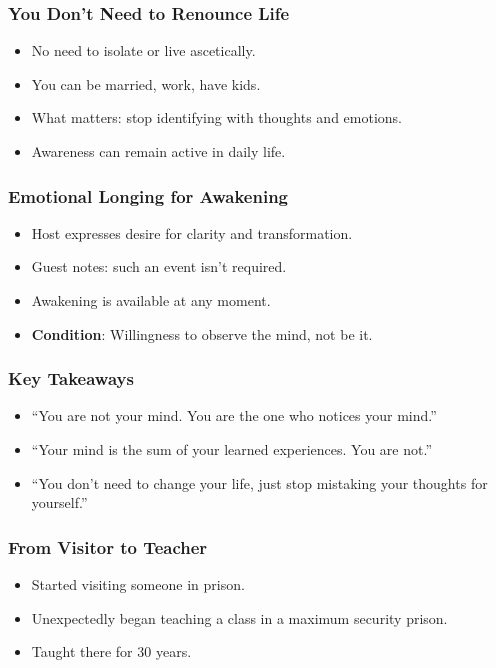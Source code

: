 \begin{frame}[fragile]\frametitle{You Don’t Need to Renounce Life}
  \begin{itemize}
    \item No need to isolate or live ascetically.
    \item You can be married, work, have kids.
    \item What matters: stop identifying with thoughts and emotions.
    \item Awareness can remain active in daily life.
  \end{itemize}
\end{frame}

\begin{frame}[fragile]\frametitle{Emotional Longing for Awakening}
  \begin{itemize}
    \item Host expresses desire for clarity and transformation.
    \item Guest notes: such an event isn’t required.
    \item Awakening is available at any moment.
    \item \textbf{Condition}: Willingness to observe the mind, not be it.
  \end{itemize}
\end{frame}

\begin{frame}[fragile]\frametitle{Key Takeaways}
  \begin{itemize}
    \item “You are not your mind. You are the one who notices your mind.”
    \item “Your mind is the sum of your learned experiences. You are not.”
    \item “You don’t need to change your life, just stop mistaking your thoughts for yourself.”
  \end{itemize}
\end{frame}

\begin{frame}[fragile]\frametitle{From Visitor to Teacher}
  \begin{itemize}
    \item Started visiting someone in prison.
    \item Unexpectedly began teaching a class in a maximum security prison.
    \item Taught there for 30 years.
  \end{itemize}
\end{frame}

